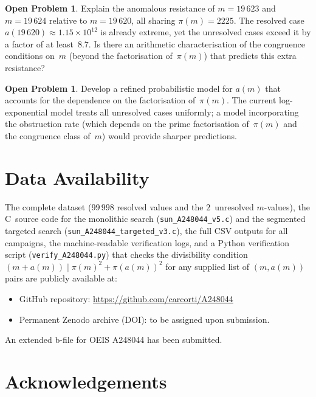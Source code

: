 \documentclass{amsart}
\theoremstyle{definition}
\newtheorem{openproblem}[theorem]{Open Problem}
\theoremstyle{remark}
\numberwithin{equation}{section}
\begin{document}
\begin{openproblem}\label{op:cluster}
Explain the anomalous resistance of $m = 19\,623$ and
$m = 19\,624$ relative to $m = 19\,620$, all sharing
$\pi(m) = 2225$.  The resolved case $a(19\,620) \approx
1.15 \times 10^{12}$ is already extreme, yet the unresolved
cases exceed it by a factor of at least~$8.7$.
Is there an arithmetic characterisation of the congruence
conditions on~$m$ (beyond the factorisation of~$\pi(m)$) that
predicts this extra resistance?
\end{openproblem}

\begin{openproblem}\label{op:model}
Develop a refined probabilistic model for $a(m)$ that
accounts for the dependence on the factorisation of~$\pi(m)$.
The current log-exponential model treats all unresolved cases
uniformly; a model incorporating the obstruction rate
(which depends on the prime factorisation of~$\pi(m)$ and the
congruence class of~$m$) would provide sharper predictions.
\end{openproblem}

\section*{Data Availability}

The complete dataset ($99\,998$ resolved values and the
$2$~unresolved $m$-values), the C~source code for the monolithic
search (\texttt{sun\_A248044\_v5.c}) and the segmented targeted
search (\texttt{sun\_A248044\_targeted\_v3.c}), the full CSV
outputs for all campaigns, the machine-readable verification
logs, and a Python verification script (\texttt{verify\_A248044.py})
that checks the divisibility condition
$(m+a(m)) \mid \pi(m)^2 + \pi(a(m))^2$ for any supplied list
of $(m, a(m))$ pairs are publicly available at:
\begin{itemize}
\item GitHub repository:
      \url{https://github.com/carcorti/A248044}
\item Permanent Zenodo archive (DOI): to be assigned upon
      submission.
\end{itemize}
An extended b-file for OEIS A248044 has been submitted.

\section*{Acknowledgements}
\end{document}

